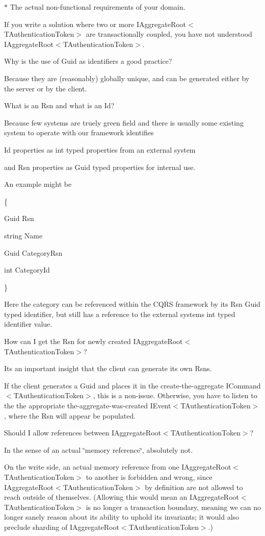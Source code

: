 $\ast$ The actual non-\/functional requirements of your domain. 

If you write a solution where two or more I\+Aggregate\+Root$<$\+T\+Authentication\+Token$>$ are transactionally coupled, you have not understood I\+Aggregate\+Root$<$\+T\+Authentication\+Token$>$. 

Why is the use of Guid as identifiers a good practice? 

Because they are (reasonably) globally unique, and can be generated either by the server or by the client. 

What is an Rsn and what is an Id? 

Because few systems are truely green field and there is usually some existing system to operate with our framework identifies 

Id properties as int typed properties from an external system 

and Rsn properties as Guid typed properties for internal use. 

An example might be 

\{ 

Guid Rsn 

string Name 

Guid Category\+Rsn 

int Category\+Id 

\} 

Here the category can be referenced within the C\+Q\+RS framework by it\textquotesingle{}s Rsn Guid typed identifier, but still has a reference to the external systems int typed identifier value. 

How can I get the Rsn for newly created I\+Aggregate\+Root$<$\+T\+Authentication\+Token$>$? 

It\textquotesingle{}s an important insight that the client can generate its own Rsns. 

If the client generates a Guid and places it in the create-\/the-\/aggregate I\+Command$<$\+T\+Authentication\+Token$>$, this is a non-\/issue. Otherwise, you have to listen to the the appropriate the-\/aggregate-\/was-\/created I\+Event$<$\+T\+Authentication\+Token$>$, where the Rsn will appear be populated. 

Should I allow references between I\+Aggregate\+Root$<$\+T\+Authentication\+Token$>$? 

In the sense of an actual \char`\"{}memory reference\char`\"{}, absolutely not. 

On the write side, an actual memory reference from one I\+Aggregate\+Root$<$\+T\+Authentication\+Token$>$ to another is forbidden and wrong, since I\+Aggregate\+Root$<$\+T\+Authentication\+Token$>$ by definition are not allowed to reach outside of themselves. (Allowing this would mean an I\+Aggregate\+Root$<$\+T\+Authentication\+Token$>$ is no longer a transaction boundary, meaning we can no longer sanely reason about its ability to uphold its invariants; it would also preclude sharding of I\+Aggregate\+Root$<$\+T\+Authentication\+Token$>$.) 

